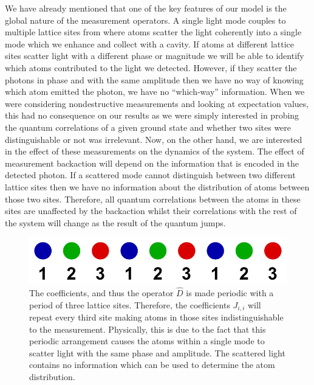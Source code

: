 We have already mentioned that one of the key features of our model is
the global nature of the measurement operators. A single light mode
couples to multiple lattice sites from where atoms scatter the light
coherently into a single mode which we enhance and collect with a
cavity. If atoms at different lattice sites scatter light with a
different phase or magnitude we will be able to identify which atoms
contributed to the light we detected. However, if they scatter the
photons in phase and with the same amplitude then we have no way of
knowing which atom emitted the photon, we have no ``which-way''
information. When we were considering nondestructive measurements and
looking at expectation values, this had no consequence on our results
as we were simply interested in probing the quantum correlations of a
given ground state and whether two sites were distinguishable or not
was irrelevant. Now, on the other hand, we are interested in the
effect of these measurements on the dynamics of the system. The effect
of measurement backaction will depend on the information that is
encoded in the detected photon. If a scattered mode cannot
distinguish between two different lattice sites then we have no
information about the distribution of atoms between those two sites.
Therefore, all quantum correlations between the atoms in these sites
are unaffected by the backaction whilst their correlations with the
rest of the system will change as the result of the quantum jumps.

\begin{figure}[htbp!]
  \centering
  \includegraphics[width=1.0\textwidth]{1DModes}
  \caption[1D Modes due to Measurement Backaction]{The coefficients,
    and thus the operator $\hat{D}$ is made periodic with a period of
    three lattice sites. Therefore, the coefficients $J_{i,i}$ will
    repeat every third site making atoms in those sites
    indistinguishable to the measurement. Physically, this is due to
    the fact that this periodic arrangement causes the atoms within a
    single mode to scatter light with the same phase and amplitude.
    The scattered light contains no information which can be used to
    determine the atom distribution.}
  \label{fig:1dmodes}
\end{figure}

